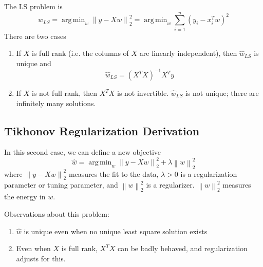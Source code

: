 \documentclass[12pt]{article}
\theoremstyle{definition}
\DeclareMathOperator*{\argmin}{arg\,min}
\newcommand{\norm}[1]{\left\lVert#1\right\rVert}
\begin{document}
The LS problem is
\begin{equation}
	\hat w_{LS} = \argmin_w \norm{y - Xw}^2_2  = \argmin_w \sum_{i=1}^n (y_i - x^T_i w)^2
\end{equation}
There are two cases
\begin{enumerate}
	\item If $X$ is full rank (i.e. the columns of $X$ are linearly independent), then $\hat w_{LS}$ is unique and 
	\begin{equation}
		\hat w_{LS} = (X^T X)^{-1} X^T y
	\end{equation}
	\item If $X$ is not full rank, then $X^T X$ is not invertible. $\hat w_{LS}$ is not unique; there are infinitely many solutions. 
\end{enumerate}

\subsection{Tikhonov Regularization Derivation}
In this second case, we can define a new objective
\begin{equation}
	\hat w = \argmin_w \norm{y - Xw}^2_2 + \lambda \norm{w}^2_2
\end{equation}
where $\norm{y - Xw}^2_2$ measures the fit to the data, $\lambda > 0$ is a regularization parameter or tuning parameter, and $\norm{w}^2_2$ is a regularizer. $\norm{w}^2_2$ measures the energy in $w$. 

Observations about this problem:
\begin{enumerate}
	\item $\hat w$ is unique even when no unique least square solution exists
	\item Even when $X$ is full rank, $X^T X$ can be badly behaved, and regularization adjusts for this. 
\end{enumerate}
\end{document}
